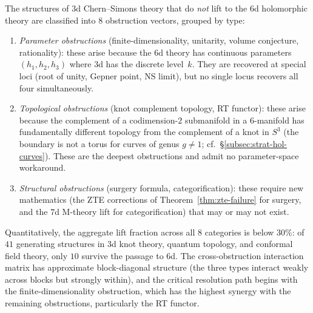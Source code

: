 \begin{remark}
\label{rem:3d-6d-obstruction-catalogue}
The structures of $3$d Chern--Simons theory that do \emph{not} lift to the $6$d holomorphic theory are classified into $8$ obstruction vectors, grouped by type:

\begin{enumerate}[label=\textup{(\arabic*)}]
\item \emph{Parameter obstructions} (finite-dimensionality, unitarity, volume conjecture, rationality): these arise because the $6$d theory has continuous parameters $(h_1, h_2, h_3)$ where $3$d has the discrete level~$k$. They are recovered at special loci (root of unity, Gepner point, NS limit), but no single locus recovers all four simultaneously.
\item \emph{Topological obstructions} (knot complement topology, RT functor): these arise because the complement of a codimension-$2$ submanifold in a $6$-manifold has fundamentally different topology from the complement of a knot in $S^3$ (the boundary is not a torus for curves of genus $g \neq 1$; cf.\ \S\ref{subsec:strat-hol-curves}). These are the deepest obstructions and admit no parameter-space workaround.
\item \emph{Structural obstructions} (surgery formula, categorification): these require new mathematics (the ZTE corrections of Theorem~\ref{thm:zte-failure} for surgery, and the $7$d M-theory lift for categorification) that may or may not exist.
\end{enumerate}

\noindent Quantitatively, the aggregate lift fraction across all $8$ categories is below $30\%$: of $41$ generating structures in $3$d knot theory, quantum topology, and conformal field theory, only $10$ survive the passage to $6$d. The cross-obstruction interaction matrix has approximate block-diagonal structure (the three types interact weakly across blocks but strongly within), and the critical resolution path begins with the finite-dimensionality obstruction, which has the highest synergy with the remaining obstructions, particularly the RT functor.
\end{remark}

